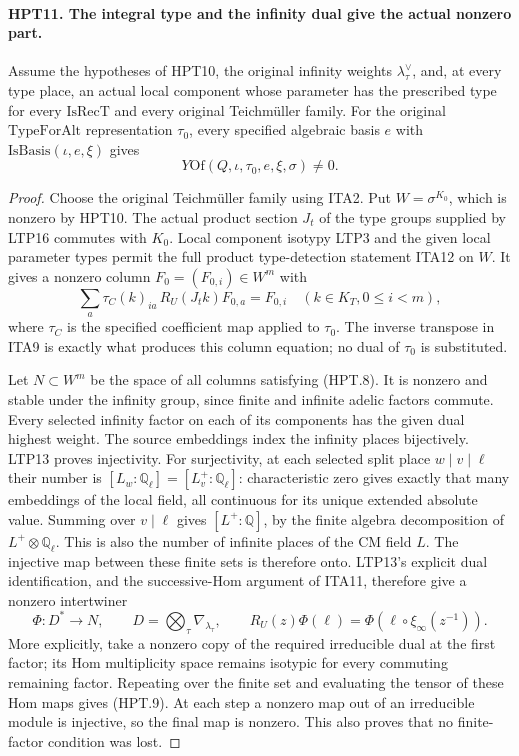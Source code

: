 \documentclass[11pt,a4paper]{article}
\numberwithin{equation}{section}
\theoremstyle{remark}\newtheorem{remark}[theorem]{Remark}
\begin{document}
\paragraph{HPT11. The integral type and the infinity dual give the actual nonzero part.}
\label{claim:HPT11}
Assume the hypotheses of HPT10, the original infinity weights
$\lambda_\tau^\vee$, and, at every type place, an actual local
component whose parameter has the prescribed type for every
$\mathrm{IsRecT}$ and every original Teichm\"uller family.
For the original $\mathrm{TypeForAlt}$ representation $\tau_0$,
every specified algebraic basis $e$ with $\mathrm{IsBasis}(\iota,e,\xi)$
gives
\[
                         Y\mathrm{Of}(Q,\iota,\tau_0,e,\xi,\sigma)\ne0.
                                                               \tag{HPT.7}
\]
\begin{proof}
Choose the original Teichm\"uller family using ITA2.  Put
$W=\sigma^{K_0}$, which is nonzero by HPT10.  The actual product
section $J_t$ of the type groups supplied by LTP16 commutes with
$K_0$.  Local component isotypy LTP3 and the given local parameter
types permit the full product type-detection statement ITA12 on
$W$.  It gives a nonzero column $F_0=(F_{0,i})\in W^m$ with
\[
       \sum_a\tau_C(k)_{ia}\,R_U(J_tk)F_{0,a}=F_{0,i}
                   \quad(k\in K_T, 0\leq i<m),                \tag{HPT.8}
\]
where $\tau_C$ is the specified coefficient map applied to
$\tau_0$.  The inverse transpose in ITA9 is exactly what produces
this column equation; no dual of $\tau_0$ is substituted.

Let $N\subset W^m$ be the space of all columns satisfying
(HPT.8).  It is nonzero and stable under the infinity group,
since finite and infinite adelic factors commute.  Every selected
infinity factor on each of its components has the given dual
highest weight.  The source embeddings index the infinity places
bijectively.  LTP13 proves injectivity.  For surjectivity, at each
selected split place $w\mid v\mid\ell$ their number is
$[L_w:\mathbb Q_\ell]=[L_v^+:\mathbb Q_\ell]$: characteristic
zero gives exactly that many embeddings of the local field,
all continuous for its unique extended absolute value.
Summing over $v\mid\ell$ gives $[L^+:\mathbb Q]$, by the
finite algebra decomposition of $L^+\otimes\mathbb Q_\ell$.
This is also the number of infinite places of the CM field $L$.
The injective map between these finite sets is therefore onto.
LTP13's explicit dual identification,
and the successive-Hom argument of ITA11, therefore give a
nonzero intertwiner
\[
       \Phi:D^*\longrightarrow N,\qquad
       D=\bigotimes_\tau\nabla_{\lambda_\tau},\qquad
       R_U(z)\Phi(\ell)=\Phi(\ell\circ\xi_\infty(z^{-1})).       \tag{HPT.9}
\]
More explicitly, take a nonzero copy of the required irreducible
dual at the first factor; its Hom multiplicity space remains
isotypic for every commuting remaining factor.  Repeating over
the finite set and evaluating the tensor of these Hom maps gives
(HPT.9).  At each step a nonzero map out of an irreducible module
is injective, so the final map is nonzero.  This also proves that
no finite-factor condition was lost.


\end{proof}
\end{document}
